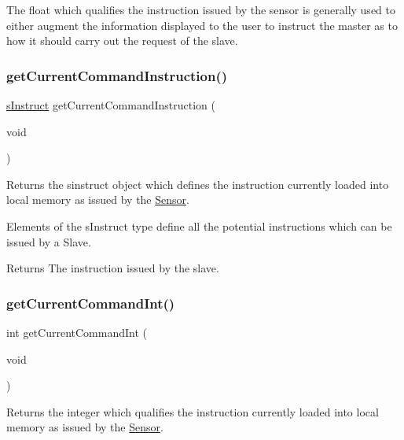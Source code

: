 The float which qualifies the instruction issued by the sensor is generally used to either augment the information displayed to the user to instruct the master as to how it should carry out the request of the slave. \mbox{\label{class_instructor_a1e54d05ded7ecf88f0205b52901df681}} 
\subsubsection{\texorpdfstring{getCurrentCommandInstruction()}{getCurrentCommandInstruction()}}
{\footnotesize\ttfamily \mbox{\hyperlink{_s_p_i___instruction_set_8h_a949ec019a0f52780dcdd7d5a5ba73e47}{s\+Instruct}} get\+Current\+Command\+Instruction (\begin{DoxyParamCaption}\item[{void}]{ }\end{DoxyParamCaption})}



Returns the sinstruct object which defines the instruction currently loaded into local memory as issued by the \mbox{\hyperlink{class_sensor}{Sensor}}. 

Elements of the s\+Instruct type define all the potential instructions which can be issued by a Slave. \begin{DoxyReturn}{Returns}
The instruction issued by the slave. 
\end{DoxyReturn}
\mbox{\label{class_instructor_adcbf1cb6d2739539465edc6d996d2987}} 
\subsubsection{\texorpdfstring{getCurrentCommandInt()}{getCurrentCommandInt()}}
{\footnotesize\ttfamily int get\+Current\+Command\+Int (\begin{DoxyParamCaption}\item[{void}]{ }\end{DoxyParamCaption})}



Returns the integer which qualifies the instruction currently loaded into local memory as issued by the \mbox{\hyperlink{class_sensor}{Sensor}}. 

